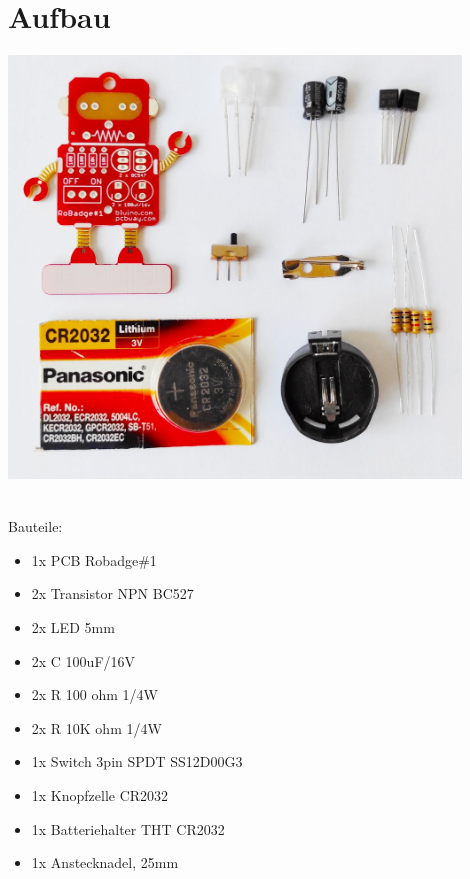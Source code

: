 \documentclass[a4paper]{article}
\begin{document}
\section{Aufbau}
\begin{minipage}[t]{\textwidth}
  \centering
  \includegraphics[width=0.9\textwidth]{../pictures/Partlist.jpg}
  \label{img:Bauteile}
\end{minipage}
\ \\
Bauteile:
\begin{itemize}
  \item     1x PCB Robadge\#1
  \item     2x Transistor NPN BC527
  \item     2x LED 5mm
  \item     2x C 100uF/16V
  \item     2x R 100 ohm 1/4W
  \item     2x R 10K ohm 1/4W
  \item     1x Switch 3pin SPDT SS12D00G3
  \item     1x Knopfzelle CR2032
  \item     1x Batteriehalter THT CR2032
  \item     1x Anstecknadel, 25mm 
\end{itemize}
\end{document}
